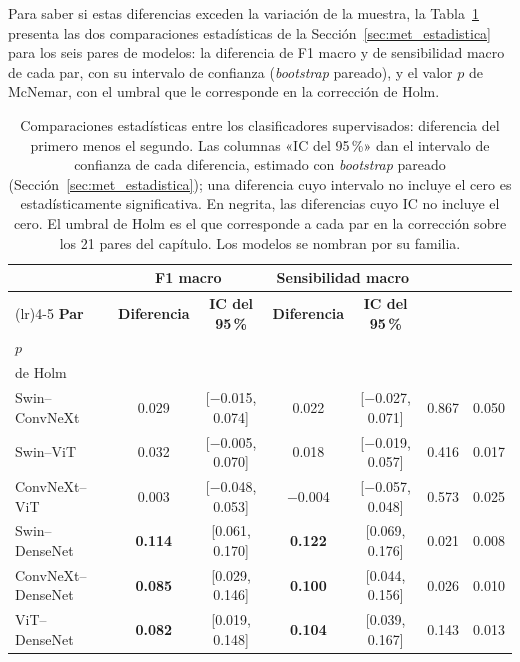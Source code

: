 Para saber si estas diferencias exceden la variación de la muestra, la Tabla~\ref{tab:res_pruebas_supervisados}
presenta las dos comparaciones estadísticas de la Sección~\ref{sec:met_estadistica} para los seis pares de modelos: la
diferencia de F1 macro y de sensibilidad macro de cada par, con su intervalo de confianza (\emph{bootstrap} pareado), y
el valor $p$ de McNemar, con el umbral que le corresponde en la corrección de Holm.

\begin{table}[H]
    \centering
    \caption{Comparaciones estadísticas entre los clasificadores supervisados: diferencia del primero menos el segundo. Las columnas «IC del 95\,\%» dan el intervalo de confianza de cada diferencia, estimado con \emph{bootstrap} pareado (Sección~\ref{sec:met_estadistica}); una diferencia cuyo intervalo no incluye el cero es estadísticamente significativa. En negrita, las diferencias cuyo IC no incluye el cero. El umbral de Holm es el que corresponde a cada par en la corrección sobre los 21 pares del capítulo. Los modelos se nombran por su familia.}
    \label{tab:res_pruebas_supervisados}
    \footnotesize
    \setlength{\tabcolsep}{2pt}
    \begin{tabularx}{\textwidth}{@{}>{\raggedright\arraybackslash}X cccccc@{}}
        \toprule
        & \multicolumn{2}{c}{\textbf{F1 macro}} & \multicolumn{2}{c}{\textbf{Sensibilidad macro}} & & \\
        \cmidrule(lr){2-3}\cmidrule(lr){4-5}
        \textbf{Par} & \textbf{Diferencia} & \textbf{IC del 95\,\%} & \textbf{Diferencia} & \textbf{IC del 95\,\%}
            & \textbf{\encabezado{McNemar\\$p$}} & \textbf{\encabezado{Umbral\\de Holm}} \\
        \midrule
        Swin--ConvNeXt & 0.029 & [$-$0.015, 0.074] & 0.022 & [$-$0.027, 0.071] & 0.867 & 0.050 \\
        Swin--ViT & 0.032 & [$-$0.005, 0.070] & 0.018 & [$-$0.019, 0.057] & 0.416 & 0.017 \\
        ConvNeXt--ViT & 0.003 & [$-$0.048, 0.053] & $-$0.004 & [$-$0.057, 0.048] & 0.573 & 0.025 \\
        Swin--DenseNet & \textbf{0.114} & [0.061, 0.170] & \textbf{0.122} & [0.069, 0.176] & 0.021 & 0.008 \\
        ConvNeXt--DenseNet & \textbf{0.085} & [0.029, 0.146] & \textbf{0.100} & [0.044, 0.156] & 0.026 & 0.010 \\
        ViT--DenseNet & \textbf{0.082} & [0.019, 0.148] & \textbf{0.104} & [0.039, 0.167] & 0.143 & 0.013 \\
        \bottomrule
    \end{tabularx}
\end{table}

